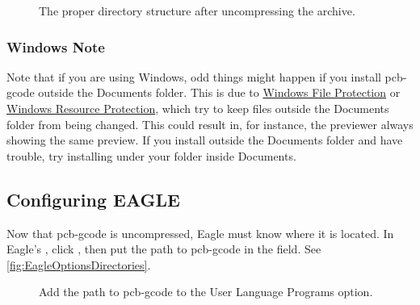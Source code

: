 \documentclass[11pt]{book}
\begin{document}
\begin{figure}
	\caption{The proper directory structure after uncompressing the archive.}
	\label{fig:folderstructure}
\end{figure}

\subsubsection{Windows Note}
Note that if you are using Windows, odd things might happen if you install pcb-gcode outside the Documents folder. This is due to \href{http://en.wikipedia.org/wiki/Windows_File_Protection}{Windows File Protection} or \href{http://en.wikipedia.org/wiki/Windows_Resource_Protection}{Windows Resource Protection}, which try to keep files outside the Documents folder from being changed. This could result in, for instance, the previewer always showing the same preview. If you install outside the Documents folder and have trouble, try installing under your folder inside Documents. 

\subsection{Configuring EAGLE}
Now that pcb-gcode is uncompressed, Eagle must know where it is located. In Eagle's , click , then put the path to pcb-gcode in the  field. See \figurename \vref{fig:EagleOptionsDirectories}.

\begin{figure}
	\caption{Add the path to pcb-gcode to the User Language Programs option.}
	\label{fig:EagleOptionsDirectories}
\end{figure}
\end{document}

